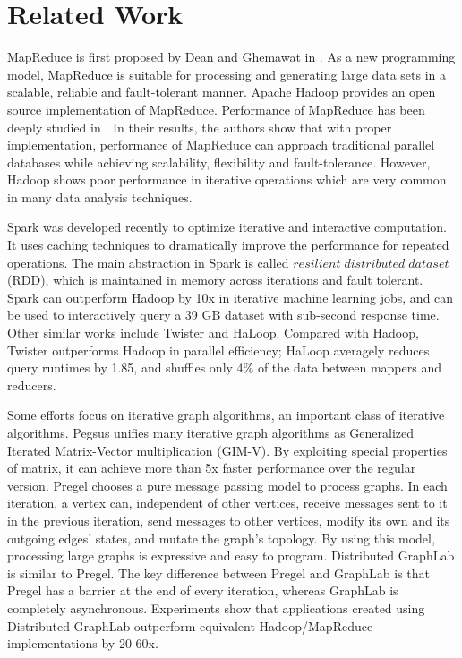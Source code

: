 \documentclass[10pt,conference,compsocconf]{IEEEtran}
\begin{document}
\section{Related Work}
\label{sec:related_work}

MapReduce is first proposed by Dean and Ghemawat in \cite{jdean2004}. As a new programming model, MapReduce is suitable for processing and generating large data sets in a scalable, reliable and fault-tolerant manner. Apache Hadoop\cite{url_hadoop} provides an open source implementation of MapReduce. Performance of MapReduce has been deeply studied in \cite{jiang2010}\cite{lee2012}. In their results, the authors show that with proper implementation, performance of MapReduce can approach traditional parallel databases while achieving scalability, flexibility and fault-tolerance. However, Hadoop shows poor performance in iterative operations which are very common in many data analysis techniques.

Spark\cite{matei2010} was developed recently to optimize iterative and interactive computation. It uses caching techniques to dramatically improve the performance for repeated operations. The main abstraction in Spark is called $resilient\;distributed\;dataset$ (RDD), which is maintained in memory across iterations and fault tolerant. Spark can outperform Hadoop by 10x in iterative machine learning jobs, and can be used to interactively query a 39 GB dataset with sub-second response time. Other similar works include Twister\cite{jaliya2010} and HaLoop\cite{yingyi2010}. Compared with Hadoop, Twister outperforms Hadoop in parallel efficiency; HaLoop averagely reduces query runtimes by 1.85, and shuffles only 4\% of the data between mappers and reducers.

Some efforts focus on iterative graph algorithms, an important class of iterative algorithms. Pegsus\cite{kang2009} unifies many iterative graph algorithms as Generalized Iterated Matrix-Vector multiplication (GIM-V). By exploiting special properties of matrix, it can achieve more than 5x faster performance over the regular version. Pregel\cite{malewicz2010} chooses a pure message passing model to process graphs. In each iteration, a vertex can, independent of other vertices, receive messages sent to it in the previous iteration, send messages to other vertices, modify its own and its outgoing edges' states, and mutate the graph's topology. By using this model, processing large graphs is expressive and easy to program. Distributed GraphLab\cite{low2012} is similar to Pregel. The key difference between Pregel and GraphLab is that Pregel has a barrier at the end of every iteration, whereas GraphLab is completely asynchronous. Experiments show that applications created using Distributed GraphLab outperform equivalent Hadoop/MapReduce implementations by 20-60x.
\end{document}
